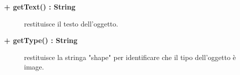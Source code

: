 \begin{description}
\begin{description}
\end{description}

\begin{description}
		\item[\textbf{\color{blue}+ getText() : String			}] \hfill
			restituisce il testo dell'oggetto. 

\end{description}

\begin{description}
		\item[\textbf{\color{blue}+ getType() : String			}] \hfill
			restituisce la stringa "shape" per identificare che il tipo dell'oggetto è image. 

\end{description}



\end{description}










